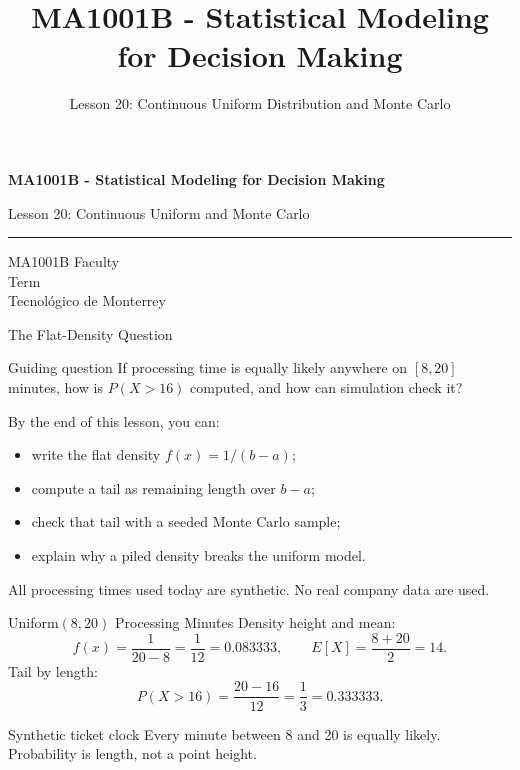 \documentclass[aspectratio=169,10pt,english]{beamer}
\title{MA1001B - Statistical Modeling for Decision Making}
\subtitle{Lesson 20: Continuous Uniform Distribution and Monte Carlo}
\author{}
\institute{Tecnol\'ogico de Monterrey}
\date{}
\begin{document}
\begin{frame}[plain]
  \vspace{1.2cm}
  {\Large\bfseries MA1001B - Statistical Modeling for Decision Making\par}
  \vspace{0.7cm}
  {\large Lesson 20: Continuous Uniform and Monte Carlo\par}
  \vspace{0.7cm}
  {\color{TecRojo}\rule{\textwidth}{1.2pt}}
  \vspace{0.8cm}

  MA1001B Faculty\\[0.3cm]
  Term\\[0.3cm]
  Tecnol\'ogico de Monterrey
\end{frame}

\begin{frame}{The Flat-Density Question}
  \begin{alertblock}{Guiding question}
    If processing time is equally likely anywhere on $[8,20]$ minutes, how
    is $P(X>16)$ computed, and how can simulation check it?
  \end{alertblock}

  \vspace{0.6em}
  By the end of this lesson, you can:
  \begin{itemize}
    \item write the flat density $f(x)=1/(b-a)$;
    \item compute a tail as remaining length over $b-a$;
    \item check that tail with a seeded Monte Carlo sample;
    \item explain why a piled density breaks the uniform model.
  \end{itemize}

  \vfill
  \scriptsize All processing times used today are synthetic. No real company data are used.
\end{frame}

\begin{frame}{Uniform$(8,20)$ Processing Minutes}
  \small
  Density height and mean:
  \[
    f(x)=\frac{1}{20-8}=\frac{1}{12}=0.083333,
    \qquad
    E[X]=\frac{8+20}{2}=14.
  \]
  Tail by length:
  \[
    P(X>16)=\frac{20-16}{12}=\frac{1}{3}=0.333333.
  \]

  \vspace{0.3em}
  \begin{exampleblock}{Synthetic ticket clock}
    Every minute between 8 and 20 is equally likely. Probability is length,
    not a point height.
  \end{exampleblock}
\end{frame}
\end{document}
